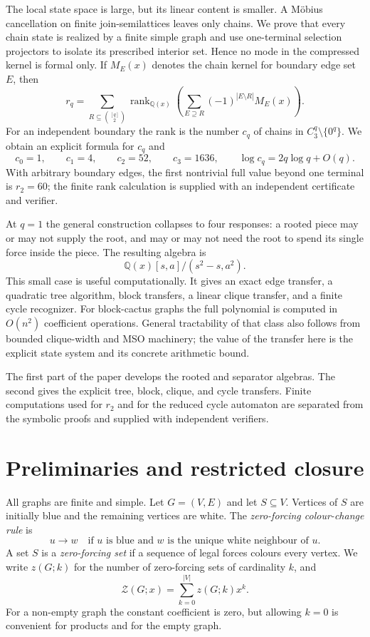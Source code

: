 \documentclass[11pt,reqno]{amsart}
\theoremstyle{definition}
\newcommand{\Zpoly}{\mathcal Z}
\begin{document}
The local state space is large, but its linear content is smaller.  A M\"obius
cancellation on finite join-semilattices leaves only chains.  We prove that
every chain state is realized by a finite simple graph and use one-terminal
selection projectors to isolate its prescribed interior set.  Hence no mode in
the compressed kernel is formal only.  If $M_E(x)$ denotes the chain kernel
for boundary edge set $E$, then
\[
  r_q=\sum_{R\subseteq\binom{[q]}2}
  \operatorname{rank}_{\mathbb Q(x)}
  \left(\sum_{E\supseteq R}(-1)^{|E\setminus R|}M_E(x)\right).
\]
For an independent boundary the rank is the number $c_q$ of chains in
$C_3^q\setminus\{0^q\}$.  We obtain an explicit formula for $c_q$ and
\[
 c_0=1,\qquad c_1=4,\qquad c_2=52,\qquad c_3=1636,
 \qquad \log c_q=2q\log q+O(q).
\]
With arbitrary boundary edges, the first nontrivial full value beyond one
terminal is $r_2=60$; the finite rank calculation is supplied with an
independent certificate and verifier.

At $q=1$ the general construction collapses to four responses: a rooted piece
may or may not supply the root, and may or may not need the root to spend its
single force inside the piece.  The resulting algebra is
\[
  \mathbb Q(x)[s,a]/(s^2-s,a^2).
\]
This small case is useful computationally.  It gives an exact edge transfer,
a quadratic tree algorithm, block transfers, a linear clique transfer, and a
finite cycle recognizer.  For block-cactus graphs the full polynomial is
computed in $O(n^2)$ coefficient operations.  General tractability of that
class also follows from bounded clique-width and MSO machinery; the value of
the transfer here is the explicit state system and its concrete arithmetic
bound.

The first part of the paper develops the rooted and separator algebras.  The
second gives the explicit tree, block, clique, and cycle transfers.  Finite
computations used for $r_2$ and for the reduced cycle automaton are separated
from the symbolic proofs and supplied with independent verifiers.

\section{Preliminaries and restricted closure}\label{sec:preliminaries}

All graphs are finite and simple.  Let $G=(V,E)$ and let $S\subseteq V$.  Vertices of $S$ are initially blue and the remaining vertices are white.  The \emph{zero-forcing colour-change rule} is
\[
  u\to w
  \quad\text{if $u$ is blue and $w$ is the unique white neighbour of $u$.}
\]
A set $S$ is a \emph{zero-forcing set} if a sequence of legal forces colours every vertex.  We write $z(G;k)$ for the number of zero-forcing sets of cardinality $k$, and
\[
  \Zpoly(G;x)=\sum_{k=0}^{|V|}z(G;k)x^k.
\]
For a non-empty graph the constant coefficient is zero, but allowing $k=0$ is convenient for products and for the empty graph.
\end{document}
